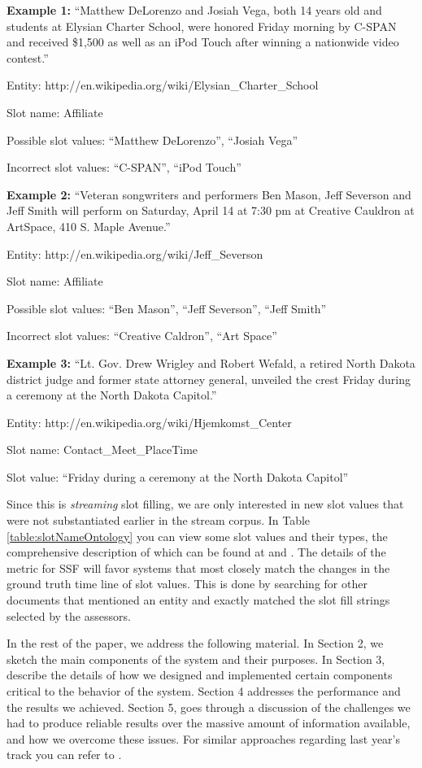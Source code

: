 \noindent \textbf{Example 1:} ``Matthew DeLorenzo and Josiah Vega, both 14 years old and students 
at Elysian Charter School, were honored Friday morning by C-SPAN and received 
\$1,500 as well as an iPod Touch after winning a nationwide video contest.''

Entity:  http://en.wikipedia.org/wiki/Elysian\_Charter\_School

Slot name: Affiliate

Possible slot values: ``Matthew DeLorenzo'', ``Josiah Vega''

Incorrect slot values: ``C-SPAN'', ``iPod Touch''

\noindent \textbf{Example 2:} ``Veteran songwriters and performers Ben Mason, Jeff Severson and 
Jeff Smith will perform on Saturday, April 14 at 7:30 pm at Creative Cauldron 
at ArtSpace, 410 S. Maple Avenue.''

Entity: http://en.wikipedia.org/wiki/Jeff\_Severson

Slot name: Affiliate

Possible slot values: ``Ben Mason'', ``Jeff Severson'', ``Jeff Smith''

Incorrect slot values: ``Creative Caldron'', ``Art Space''

\noindent \textbf{Example 3:}  ``Lt. Gov. Drew Wrigley and Robert Wefald, a retired North Dakota 
district judge and former state attorney general, unveiled the crest Friday 
during a ceremony at the North Dakota Capitol.''

Entity: http://en.wikipedia.org/wiki/Hjemkomst\_Center

Slot name: Contact\_Meet\_PlaceTime

Slot value: ``Friday during a ceremony at the North Dakota Capitol''


\noindent Since this is \textit{streaming} slot filling, we are only interested in new 
slot values that were not substantiated earlier in the stream corpus. In Table \ref{table:slotNameOntology} you can view some slot values 
and their types, the comprehensive description of which can be found at
\cite{tackbp} and \cite{aec}. The details of the metric for SSF will favor systems that most closely match the changes in the ground truth time line of slot values. This is done by searching for other documents that mentioned an entity and exactly matched the slot fill strings selected by the assessors.



In the rest of the paper, we address the following material. In Section 2, we sketch the main components of the system and their purposes. In Section 3, describe the details of how we designed and implemented certain components critical to the behavior of the system. Section 4 addresses the performance and the results we achieved. Section 5, goes through a discussion of the challenges we had to produce reliable results over the massive amount of information available, and how we overcome these issues. For similar approaches regarding last year's track you can refer to \cite{ji2011knowledge}.

